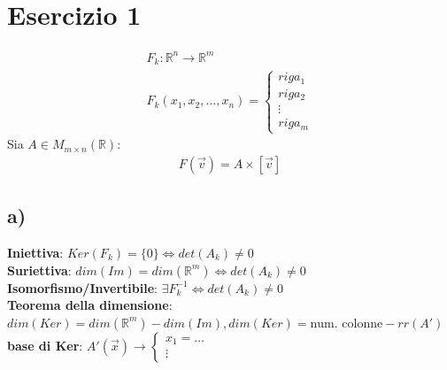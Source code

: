 \documentclass[a4paper,12pt]{article}
\begin{document}
\section*{Esercizio 1}
\begin{align*}
    F_k : \mathbb{R}^n \to \mathbb{R}^m\\
    F_k(x_1,x_2,\dots,x_n)=\begin{cases} 
        riga_1 \\
        riga_2 \\
        \vdots \\
        riga_m
    \end{cases}
\end{align*}
Sia $A \in M_{m\times n} (\mathbb{R})$: \\
\begin{align*}
    F(\vec{v})=A\times [\vec{v}]
\end{align*}
\subsection*{a)}
\textbf{Iniettiva}: $Ker(F_k)=\{0\} \iff det(A_k)\neq 0 $ \\
\textbf{Suriettiva}: $dim(Im)=dim(\mathbb{R}^{m})\iff det(A_k)\neq 0$ \\
\textbf{Isomorfismo/Invertibile}: $\exists F^{-1}_k \iff det(A_k)\neq0$ \\
\textbf{Teorema della dimensione}: $dim(Ker)=dim(\mathbb{R}^m)-dim(Im), dim(Ker)=\text{num. colonne} -rr(A')$ \\
\textbf{base di Ker}: $A'(\vec{x}) \to \begin{cases}
    x_1= \dots \\
    \vdots
\end{cases}$
\end{document}
